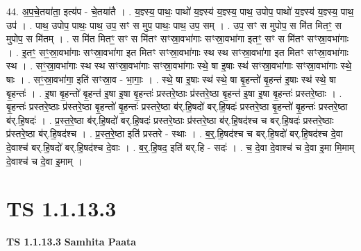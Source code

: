\documentclass[17pt]{extarticle}
\begin{document}
44. अ॒प॒चे॒तया॑ता॒ इत्य॑प - चे॒तया॑तै । . य॒ज्ञ्स्य॒ पाथः॒ पाथो॑ य॒ज्ञ्स्य॑ य॒ज्ञ्स्य॒ पाथ॒ उपोप॒ पाथो॑ य॒ज्ञ्स्य॑ य॒ज्ञ्स्य॒ पाथ॒ उप॑ । . पाथ॒ उपोप॒ पाथः॒ पाथ॒ उप॒ सꣳ स मुप॒ पाथः॒ पाथ॒ उप॒ सम् । . उप॒ सꣳ स मुपोप॒ स मि॑त मितꣳ॒॒ स मुपोप॒ स मि॑तम् । . स मि॑त मितꣳ॒॒ सꣳ स मि॑तꣳ सꣳस्रा॒वभा॑गाः सꣳस्रा॒वभा॑गा इतꣳ॒॒ सꣳ स मि॑तꣳ सꣳस्रा॒वभा॑गाः । . इ॒तꣳ॒॒ सꣳ॒॒स्रा॒वभा॑गाः सꣳस्रा॒वभा॑गा इत मितꣳ सꣳस्रा॒वभा॑गाः स्थ स्थ सꣳस्रा॒वभा॑गा इत मितꣳ सꣳस्रा॒वभा॑गाः स्थ । . सꣳ॒॒स्रा॒वभा॑गाः स्थ स्थ सꣳस्रा॒वभा॑गाः सꣳस्रा॒वभा॑गाः स्थे॒ षा इ॒षाः स्थ॑ सꣳस्रा॒वभा॑गाः सꣳस्रा॒वभा॑गाः स्थे॒ षाः । . सꣳ॒॒स्रा॒वभा॑गा॒ इति॑ सꣳस्रा॒व - भा॒गाः॒ । . स्थे॒ षा इ॒षाः स्थ॑ स्थे॒ षा बृ॒हन्तो॑ बृ॒हन्त॑ इ॒षाः स्थ॑ स्थे॒ षा बृ॒हन्तः॑ । . इ॒षा बृ॒हन्तो॑ बृ॒हन्त॑ इ॒षा इ॒षा बृ॒हन्तः॑ प्रस्तरे॒ष्ठाः प्र॑स्तरे॒ष्ठा बृ॒हन्त॑ इ॒षा इ॒षा बृ॒हन्तः॑ प्रस्तरे॒ष्ठाः । . बृ॒हन्तः॑ प्रस्तरे॒ष्ठाः प्र॑स्तरे॒ष्ठा बृ॒हन्तो॑ बृ॒हन्तः॑ प्रस्तरे॒ष्ठा ब॑र्.हि॒षदो॑ बर्.हि॒षदः॑ प्रस्तरे॒ष्ठा बृ॒हन्तो॑ बृ॒हन्तः॑ प्रस्तरे॒ष्ठा ब॑र्.हि॒षदः॑ । . प्र॒स्त॒रे॒ष्ठा ब॑र्.हि॒षदो॑ बर्.हि॒षदः॑ प्रस्तरे॒ष्ठाः प्र॑स्तरे॒ष्ठा ब॑र्.हि॒षद॑श्च च बर्.हि॒षदः॑ प्रस्तरे॒ष्ठाः प्र॑स्तरे॒ष्ठा ब॑र्.हि॒षद॑श्च । . प्र॒स्त॒रे॒ष्ठा इति॑ प्रस्तरे - स्थाः । . ब॒र्॒.हि॒षद॑श्च च बर्.हि॒षदो॑ बर्.हि॒षद॑श्च दे॒वा दे॒वाश्च॑ बर्.हि॒षदो॑ बर्.हि॒षद॑श्च दे॒वाः । . ब॒र्॒.हि॒षद॒ इति॑ बर्.हि - सदः॑ । . च॒ दे॒वा दे॒वाश्च॑ च दे॒वा इ॒मा मि॒माम् दे॒वाश्च॑ च दे॒वा इ॒माम् । \newline
\pagebreak
{}
\section*{ TS 1.1.13.3 }

\textbf{TS 1.1.13.3 } \newline
\textbf{Samhita Paata} \newline
\end{document}
